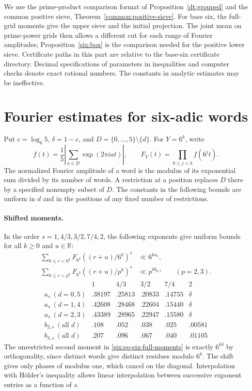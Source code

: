 \documentclass[11pt,a4paper]{article}
\theoremstyle{paperplain}
\numberwithin{equation}{section}
\begin{document}
We use the prime-product comparison format of Proposition~\ref{dt:grouped}
and the common positive sieve, Theorem~\ref{common:positive-sieve}.
For base six, the full-grid moments give the upper sieve and the initial projection.
The joint mean on prime-power grids then allows a different cut for
each range of Fourier amplitudes;
Proposition~\ref{six:box} is the comparison needed for the positive
lower sieve. Certificate paths in this part are relative to the base-six
certificate directory. Decimal specifications of parameters in inequalities
and computer checks denote exact rational numbers. The constants
in analytic estimates may be ineffective.

\section{Fourier estimates for six-adic words}
\label{six:sec-six-word-moments}

Put $c=\log_6 5$, $\delta=1-c$, and $D=\{0,\ldots,5\}\setminus\{d\}$.
For $Y=6^k$, write
\[
 f(t)=\frac15\left|\sum_{a\in D}\exp(2\pi iat)\right|,\qquad
 F_Y(t)=\prod_{0\le j<k} f(6^jt).
\]
The normalized Fourier amplitude of a word is the modulus of its
exponential sum divided by its number of words. A restriction at a
position replaces $D$ there by a specified nonempty subset of $D$.
The constants in the following bounds are uniform in $d$ and in the
positions of any fixed number of restrictions.

\paragraph{Shifted moments.}
In the order $s=1,4/3,3/2,7/4,2$, the following exponents give
uniform bounds for all $k\ge0$ and $u\in\mathbb R$:
\begin{align}
 \sum_{0\le r<6^k} F_{6^k}((r+u)/6^k)^s
     &\ll 6^{k a_s},\label{six:eq-six-full-moments}\\
 \sum_{0\le r<p^k} F_{6^k}((r+u)/p^k)^s
     &\ll p^{k b_{p,s}} \qquad(p=2,3).\label{six:eq-six-pure-moments}
\end{align}
\[
\begin{array}{c|rrrrr}
 &1&4/3&3/2&7/4&2\\ \hline
 a_s\ (d=0,5)&.38197&.25813&.20833&.14755&\delta\\
 a_s\ (d=1,4)&.42608&.28468&.22604&.15440&\delta\\
 a_s\ (d=2,3)&.43389&.28965&.22947&.15580&\delta\\ \hline
 b_{2,s}\ (\text{all }d)&.108&.052&.038&.025&.00581\\
 b_{3,s}\ (\text{all }d)&.207&.096&.067&.040&.01105
\end{array}
\]
The unrestricted second moment in \eqref{six:eq-six-full-moments} is
exactly $6^{k\delta}$ by orthogonality, since distinct words give
distinct residues modulo $6^k$. The shift gives only phases of modulus
one, which cancel on the diagonal. Interpolation with H\"older's
inequality allows linear interpolation between successive exponent
entries as a function of $s$.
\end{document}
